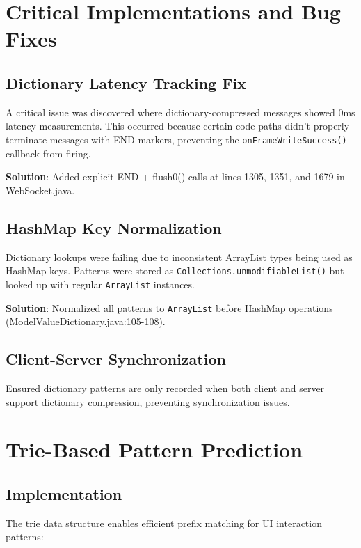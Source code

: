 \documentclass[12pt,a4paper]{article}
\begin{document}
\section{Critical Implementations and Bug Fixes}

\subsection{Dictionary Latency Tracking Fix}

A critical issue was discovered where dictionary-compressed messages showed 0ms latency measurements. This occurred because certain code paths didn't properly terminate messages with END markers, preventing the \texttt{onFrameWriteSuccess()} callback from firing.

\textbf{Solution}: Added explicit END + flush0() calls at lines 1305, 1351, and 1679 in WebSocket.java.

\subsection{HashMap Key Normalization}

Dictionary lookups were failing due to inconsistent ArrayList types being used as HashMap keys. Patterns were stored as \texttt{Collections.unmodifiableList()} but looked up with regular \texttt{ArrayList} instances.

\textbf{Solution}: Normalized all patterns to \texttt{ArrayList} before HashMap operations (ModelValueDictionary.java:105-108).

\subsection{Client-Server Synchronization}

Ensured dictionary patterns are only recorded when both client and server support dictionary compression, preventing synchronization issues.

\section{Trie-Based Pattern Prediction}

\subsection{Implementation}

The trie data structure enables efficient prefix matching for UI interaction patterns:
\end{document}
